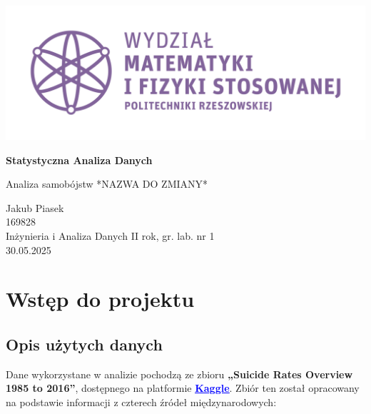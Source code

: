 \documentclass[polish]{article}
\begin{document}
    \LARGE\begin{titlepage}

        \begin{center}

        \includegraphics*{img/wmifs_pl.png}



        \vspace{3cm}

        \textbf{Statystyczna Analiza Danych}

        \vspace{1cm}
            Analiza samobójstw *NAZWA DO ZMIANY* %

        \vspace{5cm}

        \raggedleft\vfil
        Jakub Piasek\\
        169828 \\
        Inżynieria i Analiza Danych II rok, gr. lab. nr 1\\
        30.05.2025


        \end{center}

    \end{titlepage}

    \normalsize

    \tableofcontents

    \newpage

    \section{Wstęp do projektu}

    \subsection{Opis użytych danych}

    Dane wykorzystane w analizie pochodzą ze zbioru \textbf{„Suicide Rates Overview 1985 to 2016”}, dostępnego na platformie \textbf{\href{https://www.kaggle.com/datasets/russellyates88/suicide-rates-overview-1985-to-2016}{\textcolor{blue}{\uline{Kaggle}}}}. Zbiór ten został opracowany na podstawie informacji z czterech źródeł międzynarodowych:
\end{document}
